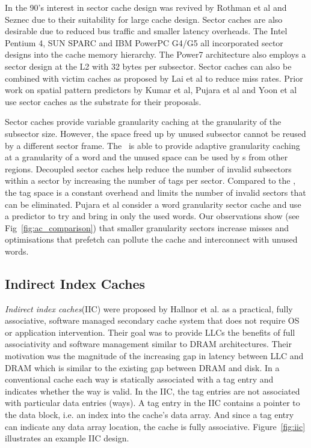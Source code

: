 In the 90's interest in sector cache design was revived by Rothman et al\cite{Rothman_Smith_2000} and Seznec\cite{Seznec-decoupled-sector-cache-isca, seznec:inria-00074588} due to their suitability for large cache design. Sector caches are also desirable due to reduced bus traffic and smaller latency overheads.  The Intel Pentium 4, SUN SPARC and IBM PowerPC G4/G5 all incorporated sector designs into the cache memory hierarchy. The Power7 architecture also employs a sector design at the L2 with 32 bytes per subsector. Sector caches can also be combined with victim caches as proposed by Lai et al\cite{Lai-victim-sector} to reduce miss rates. Prior work on spatial pattern predictors by Kumar et al\cite{kumar-isca-1998}, Pujara et al\cite{pujara-hpca-2006} and Yoon et al\cite{Yoon_Jeong_Erez_2011, yoon2012dgms} use sector caches as the substrate for their proposals.

Sector caches provide variable granularity caching at the granularity of the subsector size. However, the space freed up by unused subsector cannot be reused by a different sector frame. The \AC\ is able to provide adaptive granularity caching at a granularity of a word and the unused space can be used by \AB{}s from other regions. Decoupled sector caches\cite{Seznec-decoupled-sector-cache-isca} help reduce the number of invalid subsectors within a sector by increasing the number of tags per sector. Compared to the \AC{}, the tag space is a constant overhead and limits the number of invalid sectors that can be eliminated. Pujara et al\cite{pujara-hpca-2006} consider a word granularity sector cache and use a predictor to try and bring in only the used words. Our observations show (see Fig~\ref{fig:ac_comparison}) that smaller granularity sectors increase misses and optimisations that prefetch can pollute the cache and interconnect with unused words.

\subsection{Indirect Index Caches}

\textit{Indirect index caches}(IIC) were proposed by Hallnor et al.\cite{Hallnor_Reinhardt_2000} as a practical, fully associative, software managed secondary cache system that does not require OS or application intervention. Their goal was to provide LLCs the benefits of full associativity and software management similar to DRAM architectures. Their motivation was the magnitude of the increasing gap in latency between LLC and DRAM which is similar to the existing gap between DRAM and disk. In a conventional cache each way is statically associated with a tag entry and indicates whether the way is valid. In the IIC, the tag entries are not associated with particular data entries (ways). A tag entry in the IIC contains a pointer to the data block, i.e. an index into the cache's data array. And since a tag entry can indicate any data array location, the cache is fully associative. Figure~\ref{fig:iic} illustrates an example IIC design. 

